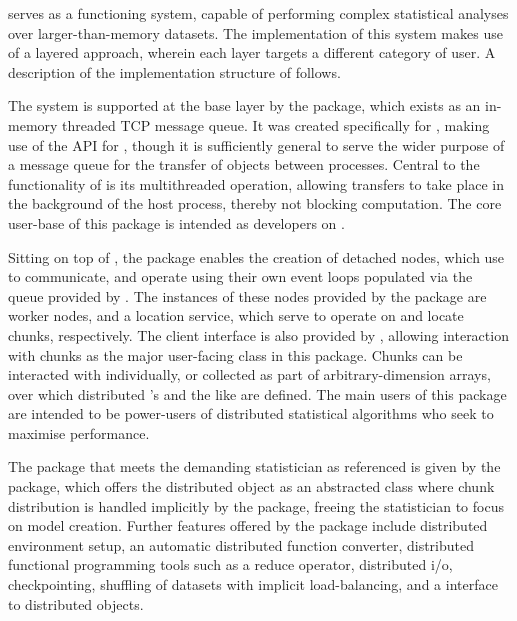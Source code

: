 \lsr{} serves as a functioning system, capable of performing complex statistical analyses over larger-than-memory datasets.
The implementation of this system makes use of a layered approach, wherein each layer targets a different category of user.
A description of the implementation structure of \lsr{} follows.

The system is supported at the base layer by the  package, which exists as an in-memory threaded TCP message queue.
It was created specifically for , making use of the  API for \R{}, though it is sufficiently general to serve the wider purpose of a message queue for the transfer of \R{} objects between \R{} processes.
Central to the functionality of  is its multithreaded operation, allowing transfers to take place in the background of the host \R{} process, thereby not blocking computation.
The core user-base of this package is intended as developers on \lsr{}.

Sitting on top of , the package  enables the creation of detached nodes, which use  to communicate, and operate using their own event loops populated via the queue provided by .
The instances of these nodes provided by the package are worker nodes, and a location service, which serve to operate on and locate chunks, respectively.
The client interface is also provided by , allowing interaction with chunks as the major user-facing class in this package.
Chunks can be interacted with individually, or collected as part of arbitrary-dimension arrays, over which distributed 's and the like are defined.
The main users of this package are intended to be power-users of distributed statistical algorithms who seek to maximise performance.

The package that meets the demanding statistician as referenced is given by the \lsr{} package, which offers the distributed object as an abstracted class where chunk distribution is handled implicitly by the package, freeing the statistician to focus on model creation.
Further features offered by the package include distributed environment setup, an automatic distributed function converter, distributed functional programming tools such as a reduce operator, distributed i/o, checkpointing, shuffling of datasets with implicit load-balancing, and a  interface to distributed objects.
